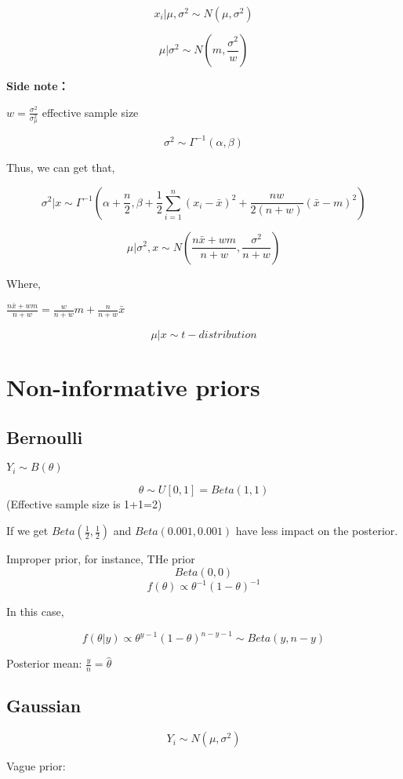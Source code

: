 \documentclass[]{book}
\begin{document}
\[x_i | \mu, \sigma^2 \sim N (\mu, \sigma^2)\]

\[\mu | \sigma^2 \sim N(m, \frac{\sigma^2}{w})\]

\textbf{Side note：}

\(w=\frac{\sigma^2}{\sigma_{\mu}^2}\) effective sample size

\[\sigma^2 \sim \Gamma^{-1}(\alpha, \beta)\]

Thus, we can get that,

\[\sigma^2 | x\sim \Gamma^{-1}(\alpha+\frac{n}{2}, \beta+\frac{1}{2} \sum_{i=1}^{n}(x_i-\bar{x})^2+\frac{nw}{2(n+w)}(\bar{x}-m)^2)\]

\[\mu| \sigma^2,x \sim N(\frac{n \bar{x}+wm}{n+w},\frac{\sigma^2}{n+w})\]

Where,

\(\frac{n \bar{x}+wm}{n+w} = \frac{w}{n+w}m+\frac{n}{n+w}\bar{x}\)

\[\mu |x \sim t - distribution \]

\section{Non-informative priors}\label{non-informative-priors}

\subsection{Bernoulli}\label{bernoulli}

\(Y_i \sim B(\theta)\)

\[\theta \sim U[0,1]= Beta (1,1)\] (Effective sample size is 1+1=2)

If we get \(Beta(\frac{1}{2},\frac{1}{2})\) and \(Beta(0.001, 0.001)\)
have less impact on the posterior.

Improper prior, for instance, THe prior \[Beta (0,0)\]
\[f(\theta) \propto \theta ^{-1}(1-\theta)^{-1}\]

In this case,

\[f(\theta| y) \propto \theta^{y-1}(1-\theta)^{n-y-1} \sim Beta(y, n-y)\]

Posterior mean: \(\frac{y}{n}=\hat{\theta}\)

\subsection{Gaussian}\label{gaussian}

\[Y_i \sim N(\mu, \sigma^2)\]

Vague prior:
\end{document}
